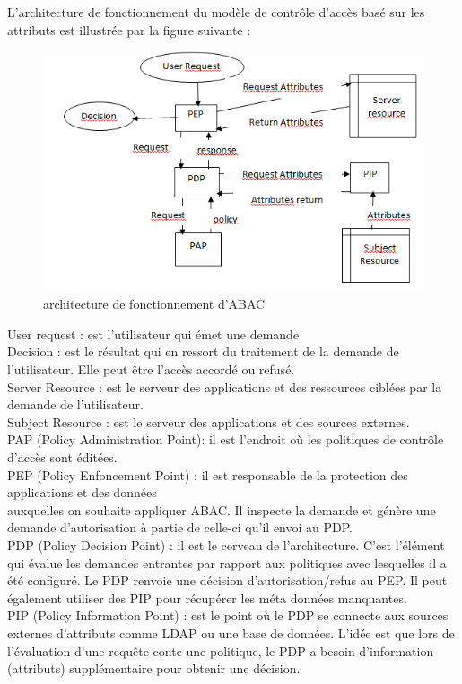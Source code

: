 \label{sectionArchitectureABAC}

L'architecture de fonctionnement du modèle de contrôle d'accès basé sur les attributs est illustrée par la figure suivante :

\begin{figure}[h!]
    \centering
		\includegraphics[scale=0.7]{chap2/images/abac.png}
    \caption{architecture de fonctionnement d'ABAC}
	 \label{figAbac}
\end{figure}

User request : est l'utilisateur qui émet une demande \\
Decision : est le résultat qui en ressort du traitement de la demande de l'utilisateur. Elle peut être l'accès accordé ou refusé.\\
Server Resource : est le serveur des applications et des ressources ciblées par la demande de l'utilisateur.\\
Subject Resource : est le serveur des applications et des sources externes.\\
PAP (Policy Administration Point): il est l'endroit où les politiques de contrôle d'accès sont éditées.\\
PEP (Policy Enfoncement Point) : il est responsable de la protection des applications et des données\\ auxquelles on souhaite appliquer ABAC. Il inspecte la demande et génère une demande d'autorisation à partie de celle-ci qu'il envoi au PDP.\\
PDP (Policy Decision Point) : il est le cerveau de l'architecture. C'est l'élément qui évalue les demandes entrantes par rapport aux politiques avec lesquelles il a été configuré. Le PDP renvoie une décision d’autorisation/refus au PEP. Il peut également utiliser des PIP pour récupérer les méta données manquantes.\\
PIP (Policy Information Point) : est le point où le PDP se connecte aux sources externes d'attributs comme LDAP ou une base de données. L'idée est que lors de l'évaluation d'une requête conte une politique, le PDP a besoin d'information (attributs) supplémentaire pour obtenir une décision.

